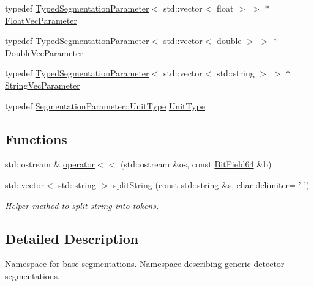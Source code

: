 \begin{DoxyCompactItemize}
\item 
typedef \hyperlink{class_d_d4hep_1_1_d_d_segmentation_1_1_typed_segmentation_parameter}{TypedSegmentationParameter}$<$ std::vector$<$ float $>$ $>$ $\ast$ \hyperlink{namespace_d_d4hep_1_1_d_d_segmentation_ab7445ed6131fb76c39c0c2463062d95e}{FloatVecParameter}
\item 
typedef \hyperlink{class_d_d4hep_1_1_d_d_segmentation_1_1_typed_segmentation_parameter}{TypedSegmentationParameter}$<$ std::vector$<$ double $>$ $>$ $\ast$ \hyperlink{namespace_d_d4hep_1_1_d_d_segmentation_ae7964d33264473a9df6cfb5194cfb740}{DoubleVecParameter}
\item 
typedef \hyperlink{class_d_d4hep_1_1_d_d_segmentation_1_1_typed_segmentation_parameter}{TypedSegmentationParameter}$<$ std::vector$<$ std::string $>$ $>$ $\ast$ \hyperlink{namespace_d_d4hep_1_1_d_d_segmentation_a6560c8ed740be64475f81e890aaa58b2}{StringVecParameter}
\item 
typedef \hyperlink{class_d_d4hep_1_1_d_d_segmentation_1_1_segmentation_parameter_a36f5f8b8d812b2a2b81363377565d8d4}{SegmentationParameter::UnitType} \hyperlink{namespace_d_d4hep_1_1_d_d_segmentation_a416c3e3ca0d578410085897700ab29dc}{UnitType}
\end{DoxyCompactItemize}
\subsection*{Functions}
\begin{DoxyCompactItemize}
\item 
std::ostream \& \hyperlink{namespace_d_d4hep_1_1_d_d_segmentation_a113bdacd047bf42526854d70d3d8ff8b}{operator$<$$<$} (std::ostream \&os, const \hyperlink{class_d_d4hep_1_1_d_d_segmentation_1_1_bit_field64}{BitField64} \&b)
\item 
std::vector$<$ std::string $>$ \hyperlink{namespace_d_d4hep_1_1_d_d_segmentation_a23185d1ff8004471cee193fe6bd946c9}{splitString} (const std::string \&\hyperlink{_volumes_8cpp_a17ca6bfc8040d695d3cada22a4763d40}{s}, char delimiter= ' ')
\begin{DoxyCompactList}\small\item\em Helper method to split string into tokens. \item\end{DoxyCompactList}\end{DoxyCompactItemize}


\subsection{Detailed Description}
Namespace for base segmentations. Namespace describing generic detector segmentations. 

